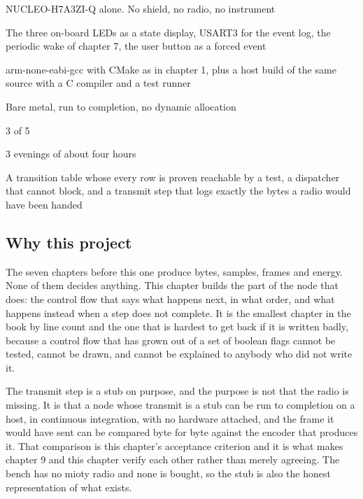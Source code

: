 
\begin{keyfacts}
\item[Board] NUCLEO-H7A3ZI-Q alone. No shield, no radio, no instrument
\item[Peripherals] The three on-board LEDs as a state display, USART3 for the event log, the periodic wake of chapter 7, the user button as a forced event
\item[Toolchain] arm-none-eabi-gcc with CMake as in chapter 1, plus a host build of the same source with a C compiler and a test runner
\item[Operating system] Bare metal, run to completion, no dynamic allocation
\item[Difficulty] 3 of 5
\item[Effort] 3 evenings of about four hours
\item[Deliverable] A transition table whose every row is proven reachable by a test, a dispatcher that cannot block, and a transmit step that logs exactly the bytes a radio would have been handed
\end{keyfacts}

\subsection*{Why this project}

The seven chapters before this one produce bytes, samples, frames and energy.
None of them decides anything. This chapter builds the part of the node that
does: the control flow that says what happens next, in what order, and what
happens instead when a step does not complete. It is the smallest chapter in
the book by line count and the one that is hardest to get back if it is written
badly, because a control flow that has grown out of a set of boolean flags
cannot be tested, cannot be drawn, and cannot be explained to anybody who did
not write it.

The transmit step is a stub on purpose, and the purpose is not that the radio
is missing. It is that a node whose transmit is a stub can be run to completion
on a host, in continuous integration, with no hardware attached, and the frame
it would have sent can be compared byte for byte against the encoder that
produces it. That comparison is this chapter's acceptance criterion and it is
what makes chapter 9 and this chapter verify each other rather than merely
agreeing. The bench has no mioty radio and none is bought, so the stub is also
the honest representation of what exists.

